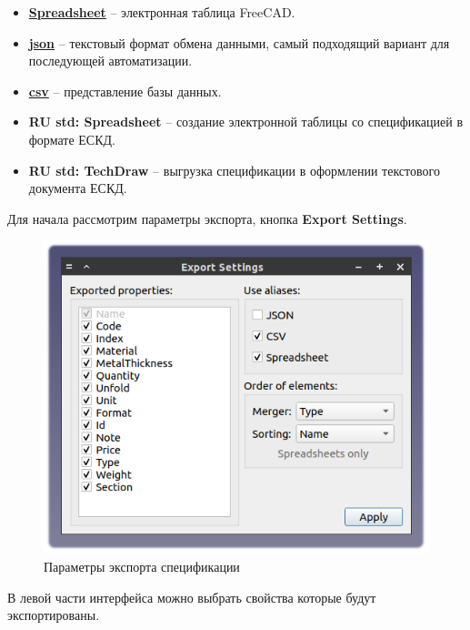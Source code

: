 \documentclass[a4paper,12pt]{article}
\begin{document}
\begin{itemize}
	\item \href{https://wiki.freecad.org/Spreadsheet_Workbench}{\textbf{Spreadsheet}} -- электронная таблица FreeCAD.
	\item \href{https://ru.wikipedia.org/wiki/JSON}{\textbf{json}} --  текстовый формат обмена данными, самый подходящий вариант для последующей автоматизации.
	\item \href{https://ru.wikipedia.org/wiki/CSV}{\textbf{csv}} -- представление базы данных.
	\item \textbf{RU std: Spreadsheet} -- создание электронной таблицы со спецификацией в формате ЕСКД.
	\item \textbf{RU std: TechDraw} -- выгрузка спецификации в оформлении текстового документа ЕСКД.\\
\end{itemize}

\begin{flushleft}Для начала рассмотрим параметры экспорта, кнопка \textbf{Export Settings}.\end{flushleft}

\begin{figure}[htp]
	\centering
	\includegraphics[scale=1]{img/specification_export.png}
	\caption{Параметры экспорта спецификации}
	\label{sec:specification_export}
\end{figure}

В левой части интерфейса можно выбрать свойства которые будут экспортированы.\\
\end{document}
